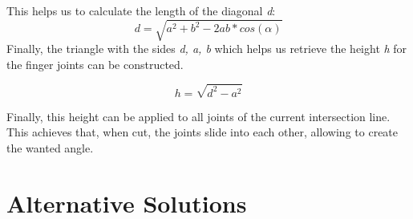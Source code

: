 \documentclass[../ClassicThesis.tex]{subfiles}
\begin{document}
    This helps us to calculate the length of the diagonal \emph{d}:
    $$ d = \sqrt{a^2 + b^2 - 2ab * cos(\alpha)}$$
    Finally, the triangle with the sides \emph{d, a, b} which helps us retrieve the height \emph{h} for the finger joints can be constructed. 
    
    $$ h = \sqrt{d^2 - a^2} $$
    
    Finally, this height can be applied to all joints of the current intersection line. This achieves that, when cut, the joints slide into each other, allowing to create the wanted angle.
    

\section{Alternative Solutions}\label{alternativeSolution}

\end{document}
